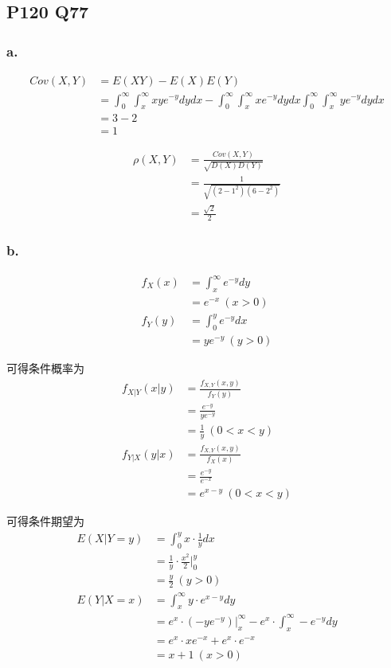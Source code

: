 \documentclass[a4paper,12pt]{ctexart}
\begin{document}
\subsection*{P120 Q77}

\subsubsection*{a.}

\begin{align*}
	Cov(X,Y) &= E(XY) - E(X)E(Y) \\
	&= \int_{0}^{\infty} \int_{x}^{\infty} xy e^{-y} dy dx - \int_{0}^{\infty} \int_{x}^{\infty} x e^{-y} dy dx \int_{0}^{\infty} \int_{x}^{\infty} y e^{-y} dy dx \\
	&= 3 - 2 \\
	&= 1
\end{align*}

\begin{align*}
	\rho(X,Y) &= \frac{Cov(X,Y)}{\sqrt{D(X)D(Y)}} \\
	&= \frac{1}{\sqrt{(2-1^2)(6-2^2)}} \\
	&= \frac{\sqrt{2}}{2}
\end{align*}

\subsubsection*{b.}

\begin{align*}
	f_X(x) &= \int_{x}^{\infty} e^{-y} dy \\
	&= e^{-x} \ (x > 0) \\
	f_Y(y) &= \int_{0}^{y} e^{-y} dx \\
	&= ye^{-y} \ (y > 0)
\end{align*}

可得条件概率为
\begin{align*}
	f_{X|Y}(x|y) &= \frac{f_{X,Y}(x,y)}{f_Y(y)} \\
	&= \frac{e^{-y}}{ye^{-y}} \\
	&= \frac{1}{y} \ (0 < x < y) \\
	f_{Y|X}(y|x) &= \frac{f_{X,Y}(x,y)}{f_X(x)} \\
	&= \frac{e^{-y}}{e^{-x}} \\
	&= e^{x-y} \ (0 < x < y)
\end{align*}

可得条件期望为
\begin{align*}
	E(X|Y = y) &= \int_{0}^{y} x \cdot \frac{1}{y} dx \\
	&= \frac{1}{y} \cdot \frac{x^2}{2} \bigg|_{0}^{y} \\
	&= \frac{y}{2} \ (y > 0) \\
	E(Y|X = x) &= \int_{x}^{\infty} y \cdot e^{x-y} dy \\
	&= e^x \cdot \left(-y e^{-y}\right) \bigg|_{x}^{\infty} - e^x \cdot \int_{x}^{\infty} -e^{-y} dy \\
	&= e^x \cdot x e^{-x} + e^x \cdot e^{-x} \\
	&= x + 1 \ (x > 0) 
\end{align*}
\end{document}
